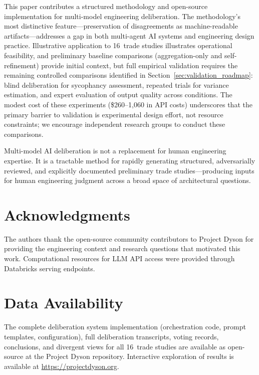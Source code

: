 \documentclass[11pt,a4paper]{article}
\begin{document}
This paper contributes a structured methodology and open-source implementation for multi-model engineering deliberation. The methodology's most distinctive feature---preservation of disagreements as machine-readable artifacts---addresses a gap in both multi-agent AI systems and engineering design practice. Illustrative application to 16~trade studies illustrates operational feasibility, and preliminary baseline comparisons (aggregation-only and self-refinement) provide initial context, but full empirical validation requires the remaining controlled comparisons identified in Section~\ref{sec:validation_roadmap}: blind deliberation for sycophancy assessment, repeated trials for variance estimation, and expert evaluation of output quality across conditions. The modest cost of these experiments (\$260--1{,}060 in API costs) underscores that the primary barrier to validation is experimental design effort, not resource constraints; we encourage independent research groups to conduct these comparisons.

Multi-model AI deliberation is not a replacement for human engineering expertise. It is a tractable method for rapidly generating structured, adversarially reviewed, and explicitly documented preliminary trade studies---producing inputs for human engineering judgment across a broad space of architectural questions.

\section*{Acknowledgments}

The authors thank the open-source community contributors to Project Dyson for providing the engineering context and research questions that motivated this work. Computational resources for LLM API access were provided through Databricks serving endpoints.

\section*{Data Availability}

The complete deliberation system implementation (orchestration code, prompt templates, configuration), full deliberation transcripts, voting records, conclusions, and divergent views for all 16~trade studies are available as open-source at the Project Dyson repository. Interactive exploration of results is available at \url{https://projectdyson.org}.
\end{document}
